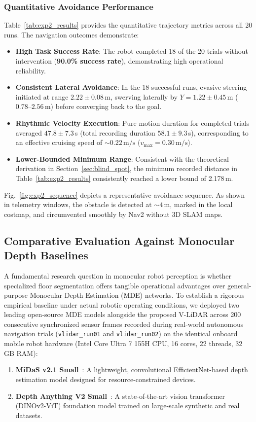 \documentclass{ieeeaccess}
\begin{document}
\subsubsection{Quantitative Avoidance Performance}
Table~\ref{tab:exp2_results} provides the quantitative trajectory metrics across all 20 runs. The navigation outcomes demonstrate:
\begin{itemize}
  \item \textbf{High Task Success Rate}: The robot completed 18 of the 20 trials without intervention (\textbf{90.0\% success rate}), demonstrating high operational reliability.
  \item \textbf{Consistent Lateral Avoidance}: In the 18 successful runs, evasive steering initiated at range $2.22 \pm 0.08$\,m, swerving laterally by $Y = 1.22 \pm 0.45$\,m ($0.78\text{--}2.56$\,m) before converging back to the goal.
  \item \textbf{Rhythmic Velocity Execution}: Pure motion duration for completed trials averaged $47.8 \pm 7.3$\,s (total recording duration $58.1 \pm 9.3$\,s), corresponding to an effective cruising speed of $\sim0.22\,\text{m/s}$ ($v_{\max} = 0.30\,\text{m/s}$).
  \item \textbf{Lower-Bounded Minimum Range}: Consistent with the theoretical derivation in Section~\ref{sec:blind_spot}, the minimum recorded distance in Table~\ref{tab:exp2_results} consistently reached a lower bound of 2.178\,m.
\end{itemize}

Fig.~\ref{fig:exp2_sequence} depicts a representative avoidance sequence. As shown in telemetry windows, the obstacle is detected at $\sim 4$\,m, marked in the local costmap, and circumvented smoothly by Nav2 without 3D SLAM maps.

\subsection{Comparative Evaluation Against Monocular Depth Baselines}
\label{subsec:baseline_benchmark}

A fundamental research question in monocular robot perception is whether specialized floor segmentation offers tangible operational advantages over general-purpose Monocular Depth Estimation (MDE) networks. To establish a rigorous empirical baseline under actual robotic operating conditions, we deployed two leading open-source MDE models alongside the proposed V-LiDAR across 200 consecutive synchronized sensor frames recorded during real-world autonomous navigation trials (\texttt{vlidar\_run01} and \texttt{vlidar\_run02}) on the identical onboard mobile robot hardware (Intel Core Ultra 7 155H CPU, 16 cores, 22 threads, 32\,GB RAM):
\begin{enumerate}
  \item \textbf{MiDaS v2.1 Small}~\cite{ranftl_2020_towards}: A lightweight, convolutional EfficientNet-based depth estimation model designed for resource-constrained devices.
  \item \textbf{Depth Anything V2 Small}~\cite{yang_2024_depth}: A state-of-the-art vision transformer (DINOv2-ViT) foundation model trained on large-scale synthetic and real datasets.
\end{enumerate}
\end{document}
